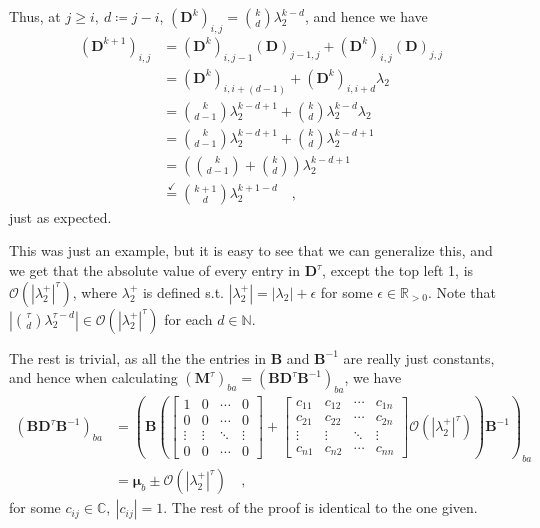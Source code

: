 \documentclass[../../main.tex]{subfiles}
\begin{document}
    Thus, at $j \geq i, \ d \coloneqq j - i$, $(\bm{D}^k)_{i,j} = \binom{k}{d} \lambda_2^{k - d}$, and hence we have
    \begin{align*}
        (\bm{D}^{k + 1})_{i,j} &= (\bm{D}^k)_{i, j - 1} (\bm{D})_{j - 1, j} + (\bm{D}^k)_{i, j} (\bm{D})_{j, j} \\
        &= (\bm{D}^k)_{i, i + (d - 1)} + (\bm{D}^k)_{i, i + d} \lambda_2 \\
        &= \binom{k}{d - 1} \lambda_2^{k - d + 1} + \binom{k}{d} \lambda_2^{k - d} \lambda_2 \\
        &= \binom{k}{d - 1} \lambda_2^{k - d + 1} + \binom{k}{d} \lambda_2^{k - d + 1} \\
        &= \left( \binom{k}{d - 1} + \binom{k}{d} \right) \lambda_2^{k - d + 1} \\
        &\overset{\checkmark}{=} \binom{k + 1}{d} \lambda_2^{k + 1 - d} \quad ,
    \end{align*}
    just as expected.

    This was just an example, but it is easy to see that we can generalize this, and we get that the absolute value of every entry in $\bm{D}^\tau$, except the top left 1, is $\mathcal{O}(|\lambda_2^+|^\tau)$, where $\lambda_2^+$ is defined s.t. $|\lambda_2^+| = |\lambda_2| + \epsilon$ for some $\epsilon \in \mathbb{R}_{>0}$. Note that $|\binom{\tau}{d} \lambda_2^{\tau - d}| \in \mathcal{O}(|\lambda_2^+|^\tau)$ for each $d \in \mathbb{N}$.

    The rest is trivial, as all the the entries in $\bm{B}$ and $\bm{B}^{-1}$ are really just constants, and hence when calculating $(\bm{M}^\tau)_{ba} = (\bm{BD}^\tau\bm{B}^{-1})_{ba}$, we have
    \begin{align*}
        (\bm{BD}^\tau\bm{B}^{-1})_{ba} &= \left( \bm{B} \left(
            \begin{bmatrix}
            1      & 0      & \cdots & 0 \\
            0      & 0      & \cdots & 0 \\
            \vdots & \vdots & \ddots & \vdots \\
            0      & 0      & \cdots & 0
            \end{bmatrix}
            +
            \begin{bmatrix}
            c_{11} & c_{12} & \cdots & c_{1n} \\
            c_{21} & c_{22} & \cdots & c_{2n} \\
            \vdots & \vdots & \ddots & \vdots \\
            c_{n1} & c_{n2} & \cdots & c_{nn}
            \end{bmatrix}
            \mathcal{O}(|\lambda_2^+|^\tau)
        \right)
        \bm{B}^{-1} \right)_{ba} \\
        &= \bm{\mu}_b \pm \mathcal{O}(|\lambda_2^+|^\tau)
        \quad ,
    \end{align*}
    for some $c_{ij} \in \mathbb{C}, \ |c_{ij}| = 1$. The rest of the proof is identical to the one given.
\end{document}

